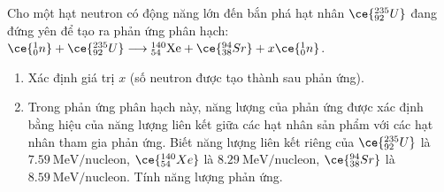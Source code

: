 \begin{ex}
	Cho một hạt neutron có động năng lớn đến bắn phá hạt nhân $\ce{_{92}^{235}U}$ đang đứng yên để tạo ra phản ứng phân hạch: $ \ce{_0^1n}+\ce{_{92}^{235}U} \longrightarrow\mathrm{_{54}^{140}Xe}+\ce{_{38}^{94}Sr}+x \ce{_0^1n}$.
	\begin{enumerate}[label=\alph*)]
		\item Xác định giá trị $x$ (số neutron được tạo thành sau phản ứng).
		\item Trong phản ứng phân hạch này, năng lượng của phản ứng được xác định bằng hiệu của năng lượng liên kết giữa các hạt nhân sản phẩm với các hạt nhân tham gia phản ứng. Biết năng lượng liên kết riêng của $\ce{_{92}^{235}U}$ là $\SI{7.59}{\mega\electronvolt/\text{nucleon}}$, $\ce{_{54}^{140}Xe}$ là $\SI{8.29}{\mega\electronvolt/\text{nucleon}}$, $\ce{_{38}^{94}Sr}$ là $\SI{8.59}{\mega\electronvolt/\text{nucleon}}$. Tính năng lượng phản ứng.
	\end{enumerate}
\end{ex}
